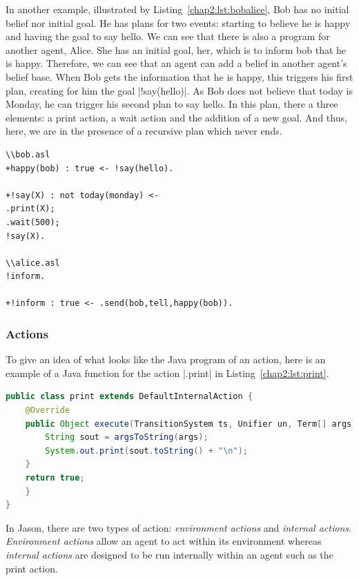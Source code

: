 \documentclass[a4paper,11pt,twoside]{StyleThese}
\begin{document}
In another example, illustrated by Listing~\ref{chap2:lst:bobalice}, Bob has no initial belief nor initial goal. He has plans for two events: starting to believe he is happy and having the goal to say hello. We can see that there is also a program for another agent, Alice. She has an initial goal, her, which is to inform bob that he is happy. Therefore, we can see that an agent can add a belief in another agent's belief base. When Bob gets the information that he is happy, this triggers his first plan, creating for him the goal |!say(hello)|. As Bob does not believe that today is Monday, he can trigger his second plan to say hello. In this plan, there a three elements: a print action, a wait action and the addition of a new goal. And thus, here, we are in the presence of a recursive plan which never ends. 

\begin{lstlisting}[caption={ASL programs of Bob and Alice, two Jason agent}, label={chap2:lst:bobalice}]
\\bob.asl
+happy(bob) : true <- !say(hello).

+!say(X) : not today(monday) <- 
.print(X); 
.wait(500); 
!say(X).

\\alice.asl
!inform.

+!inform : true <- .send(bob,tell,happy(bob)).
\end{lstlisting} 

\subsubsection{Actions} To give an idea of what looks like the Java program of an action, here is an example of a Java function for the action |.print| in Listing~\ref{chap2:lst:print}.

\begin{lstlisting}[caption={.print action}, label={chap2:lst:print}, language=Java]
public class print extends DefaultInternalAction {
	@Override
	public Object execute(TransitionSystem ts, Unifier un, Term[] args) throws Exception {
		String sout = argsToString(args);
		System.out.print(sout.toString() + "\n");
	}
	return true;
	}
}
\end{lstlisting} 

In Jason, there are two types of action: \textit{environment actions} and \textit{internal actions}. \textit{Environment actions} allow an agent to act within its environment whereas \textit{internal actions} are designed to be run internally within an agent such as the print action.
\end{document}
